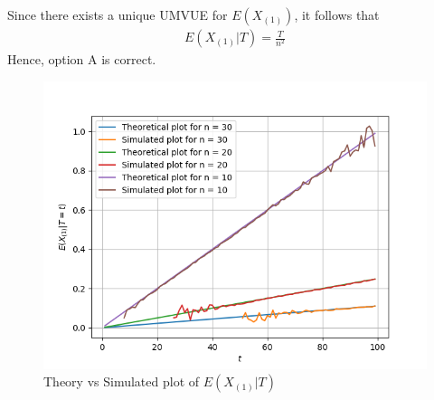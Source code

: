 \documentclass[journal,12pt,twocolumn]{IEEEtran}
\begin{document}
Since there exists a unique UMVUE for $E(X_{(1)})$, it follows that 
\begin{align}
E(X_{(1)} | T) = \frac{T}{n^2} 
\end{align}
Hence, option A is correct.
\begin{figure}[!hbt]
    \centering
	\includegraphics[width=\columnwidth]{./Figures/Figure_1.png}
    \caption{Theory vs Simulated plot of $E(X_{(1)} |T)$}
    \label{CDF_Y}
\end{figure}
\end{document}
